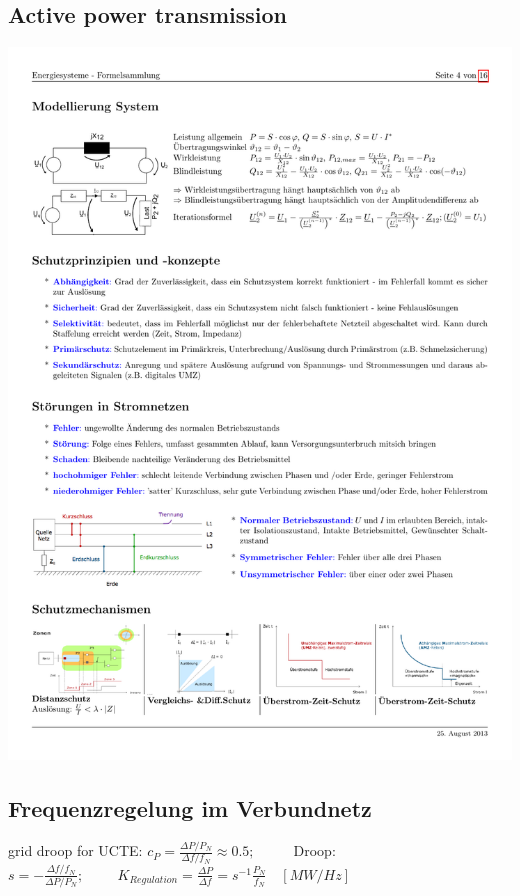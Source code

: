	\subsection{Active power transmission}
		\includegraphics[width=\textwidth]{./images/MOdellierung.pdf}	
		
	\subsection{Frequenzregelung im Verbundnetz}
		grid droop for UCTE: $c_P = \frac{\Delta P / P_N}{\Delta f / f_N}  \approx 0.5; \hspace{1cm}$ Droop: $s = - \frac{\Delta f / f_N}{\Delta P / P_N}; \hspace{1cm}  K_{Regulation} = \frac{\Delta P}{\Delta f} = s^{-1} \frac{P_N}{f_N} \quad [MW/Hz]$ \newline
		
